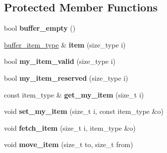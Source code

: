 \subsection*{Protected Member Functions}
\begin{DoxyCompactItemize}
\item 
\hypertarget{classinternal_1_1item__buffer_a7e6d9e3ceb150c6d9385c2c7e6d871f7}{}bool {\bfseries buffer\+\_\+empty} ()\label{classinternal_1_1item__buffer_a7e6d9e3ceb150c6d9385c2c7e6d871f7}

\item 
\hypertarget{classinternal_1_1item__buffer_a33b603d02542bdb9a3f7e183ed946389}{}\hyperlink{structinternal_1_1type__plus__align}{buffer\+\_\+item\+\_\+type} \& {\bfseries item} (size\+\_\+type i)\label{classinternal_1_1item__buffer_a33b603d02542bdb9a3f7e183ed946389}

\item 
\hypertarget{classinternal_1_1item__buffer_aaede3250f521db8646105ed19575a363}{}bool {\bfseries my\+\_\+item\+\_\+valid} (size\+\_\+type i)\label{classinternal_1_1item__buffer_aaede3250f521db8646105ed19575a363}

\item 
\hypertarget{classinternal_1_1item__buffer_a96050e4cf62eafae2a76bf05bf7ca986}{}bool {\bfseries my\+\_\+item\+\_\+reserved} (size\+\_\+type i)\label{classinternal_1_1item__buffer_a96050e4cf62eafae2a76bf05bf7ca986}

\item 
\hypertarget{classinternal_1_1item__buffer_a44afbe2ccd16c812c30570a680c5246d}{}const item\+\_\+type \& {\bfseries get\+\_\+my\+\_\+item} (size\+\_\+t i)\label{classinternal_1_1item__buffer_a44afbe2ccd16c812c30570a680c5246d}

\item 
\hypertarget{classinternal_1_1item__buffer_aa281ccb21cd8c058d1eae54c59ec718b}{}void {\bfseries set\+\_\+my\+\_\+item} (size\+\_\+t i, const item\+\_\+type \&o)\label{classinternal_1_1item__buffer_aa281ccb21cd8c058d1eae54c59ec718b}

\item 
\hypertarget{classinternal_1_1item__buffer_a8bc870040aaa121903d73017a9192313}{}void {\bfseries fetch\+\_\+item} (size\+\_\+t i, item\+\_\+type \&o)\label{classinternal_1_1item__buffer_a8bc870040aaa121903d73017a9192313}

\item 
\hypertarget{classinternal_1_1item__buffer_a1ea798500c075d40e548f39dd4149ad1}{}void {\bfseries move\+\_\+item} (size\+\_\+t to, size\+\_\+t from)\label{classinternal_1_1item__buffer_a1ea798500c075d40e548f39dd4149ad1}


\end{DoxyCompactItemize}
